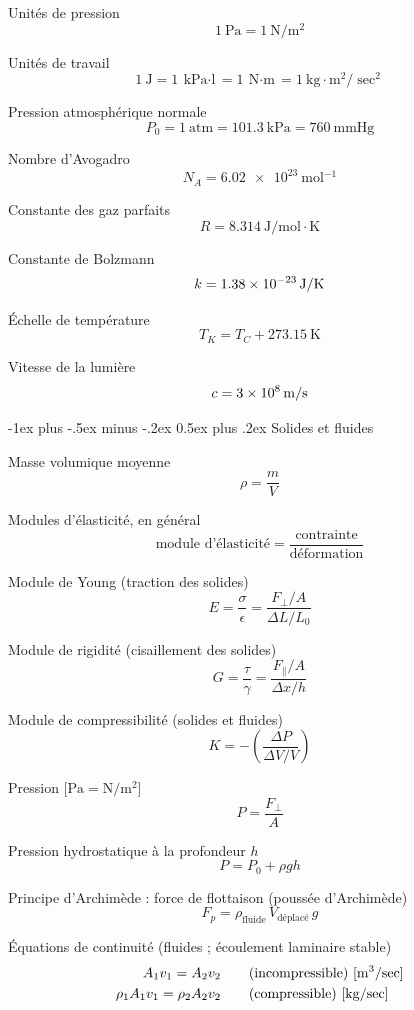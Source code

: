 \documentclass[10pt,landscape]{article}
\makeatletter
\renewcommand{\section}{\@startsection{section}{1}{0mm}%
                                {-1ex plus -.5ex minus -.2ex}%
                                {0.5ex plus .2ex}%
                                {\normalfont\large\bfseries}}
\makeatother
\begin{document}
\begin{multicols}{3}
Unités de pression
\[ \SI{1}{\pascal} = \SI{1}{\newton/\meter^2} \]

Unités de travail
\[ \SI{1}{\joule} = \SI{1}{\kilo\pascal\cdot\litre} = \SI{1}{\newton\cdot\meter} = \SI{1}{\kilo\gram\cdot\metre^2/\sec^2} \]

Pression atmosphérique normale
\[ P_0 = \SI{1}{\text{atm}} = \SI{101,3}{\kilo\pascal}
= \SI{760}{\mmHg} \]

Nombre d'Avogadro
\[ N_A = \SI{6,02e23}{\mol^{-1}}\]

Constante des gaz parfaits
\[ R = \SI{8,314}{\joule/\mole\cdot\kelvin} \]

Constante de Bolzmann
\[ k = \SI{1,38E-23}{\joule/\kelvin} \]

Échelle de température
\[ T_K = T_C + \SI{273,15}{\kelvin} \]

Vitesse de la lumière
\[ c = \SI{3E8}{\meter/\second}  \]

\hrulefill


\section{Solides et fluides}

Masse volumique moyenne
\[ \rho = \frac{m}{V} \]

Modules d'élasticité, en général
\[ \text{module d'élasticité} = \frac{\text{contrainte}}{\text{déformation}} \]

Module de Young (traction des solides)
\[ E = \frac{\sigma}{\epsilon} 
= \frac{{F_\perp}/{A}}{{\Delta L}/{L_0}} 
\]

Module de rigidité (cisaillement des solides)
\[ G = \frac{\tau}{\gamma} 
= \frac{F_\parallel/A}{{\Delta x}/{h}} 
\]

Module de compressibilité (solides et fluides)
\[ K = - \left(\frac{\Delta P}{\Delta V / V} \right)\]

Pression [$\si{\pascal} = \si{\newton/\metre^2}$]
\[ P = \frac{F_\perp}{A} \]

Pression hydrostatique à la profondeur $h$
\[ P = P_0 + \rho gh \]

Principe d'Archimède : force de flottaison (poussée d'Archimède)
\[ F_p = \rho_\text{fluide} \, V_\text{déplacé} \, g \]

Équations de continuité (fluides ; écoulement laminaire stable)
\begin{align*}
	A_1 v_1 = A_2 v_2 \qquad &\text{(incompressible) [\si{\meter^3/\sec]}} \\
	\rho_1 A_1 v_1 = \rho_2 A_2 v_2 \qquad &\text{(compressible) [\si{\kilogram/\sec}]}
\end{align*}


\end{multicols}
\end{document}
